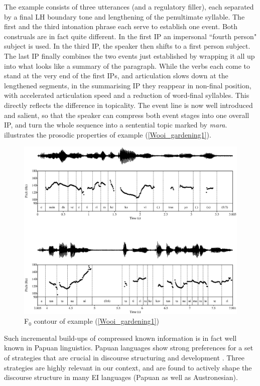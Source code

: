 The example consists of three utterances (and a regulatory filler), each separated by a final LH boundary tone and lengthening of the penultimate syllable. The first and the third intonation phrase each serve to establish one event. Both construals are in fact quite different. In the first IP an impersonal ``fourth person" subject is used. In the third IP, the speaker then shifts to a first person subject. The last IP finally combines the two events just established by wrapping it all up into what looks like a summary of the paragraph. While the verbs each come to stand at the very end of the first IPs, and articulation slows down at the lengthened segments, in the summarising IP they reappear in non-final position, with accelerated articulation speed and a reduction of word-final syllables. This directly reflects the difference in topicality. The event line is now well introduced and salient, so that the speaker can compress both event stages into one overall IP, and turn the whole sequence into a sentential topic marked by \textit{mara}.  illustrates the prosodic properties of example (\ref{Wooi_gardening1}).

\begin{figure}
\includegraphics[width=1\textwidth]{figures/gardening1_burnplant.eps} 
\caption{F$_0$ contour of example (\ref{Wooi_gardening1})}\label{fig:gardening_pitch}
\end{figure}

Such incremental build-ups of compressed known information is in fact well known in Papuan linguistics. Papuan languages show strong preferences for a set of strategies that are crucial in discourse structuring and development \citep{devries2005towards, devries2006areal}. Three strategies are highly relevant in our context, and are found to actively shape the discourse structure in many EI languages (Papuan as well as Austronesian). 

